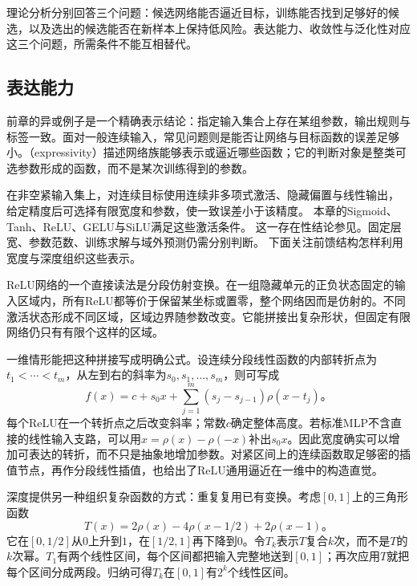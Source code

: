 理论分析分别回答三个问题：候选网络能否逼近目标，训练能否找到足够好的候选，以及选出的候选能否在新样本上保持低风险。表达能力、收敛性与泛化性对应这三个问题，所需条件不能互相替代。

\subsection{表达能力}
\label{sec:ffn-expressivity}

前章的异或例子是一个精确表示结论：指定输入集合上存在某组参数，输出规则与标签一致。面对一般连续输入，常见问题则是能否让网络与目标函数的误差足够小。（expressivity）描述网络族能够表示或逼近哪些函数；它的判断对象是整类可选参数形成的函数，而不是某次训练得到的参数。

在非空紧输入集上，对连续目标使用连续非多项式激活、隐藏偏置与线性输出，
给定精度后可选择有限宽度和参数，使一致误差小于该精度。
本章的Sigmoid、Tanh、ReLU、GELU与SiLU满足这些激活条件。
这一存在性结论参见。固定层宽、参数范数、训练求解与域外预测仍需分别判断。
下面关注前馈结构怎样利用宽度与深度组织这些表示。

ReLU网络的一个直接读法是分段仿射变换。在一组隐藏单元的正负状态固定的输入区域内，所有ReLU都等价于保留某坐标或置零，整个网络因而是仿射的。不同激活状态形成不同区域，区域边界随参数改变。它能拼接出复杂形状，但固定有限网络仍只有有限个这样的区域。

一维情形能把这种拼接写成明确公式。设连续分段线性函数的内部转折点为$t_1<\cdots<t_m$，从左到右的斜率为$s_0,s_1,\ldots,s_m$，则可写成
\begin{equation}
  f(x)=c+s_0x+
  \sum_{j=1}^{m}(s_j-s_{j-1})\rho(x-t_j)\text{。}
  \label{eq:ffn-piecewise-linear-representation}
\end{equation}
每个ReLU在一个转折点之后改变斜率；常数$c$确定整体高度。若标准MLP不含直接的线性输入支路，可以用$x=\rho(x)-\rho(-x)$补出$s_0x$。因此宽度确实可以增加可表达的转折，而不只是抽象地增加参数。对紧区间上的连续函数取足够密的插值节点，再作分段线性插值，也给出了ReLU通用逼近在一维中的构造直觉。

深度提供另一种组织复杂函数的方式：重复复用已有变换。考虑$[0,1]$上的三角形函数
\begin{equation}
  T(x)=2\rho(x)-4\rho(x-1/2)+2\rho(x-1)\text{。}
  \label{eq:ffn-tent-function}
\end{equation}
它在$[0,1/2]$从$0$上升到$1$，在$[1/2,1]$再下降到$0$。令$T_k$表示$T$复合$k$次，而不是$T$的$k$次幂。$T_1$有两个线性区间，每个区间都把输入完整地送到$[0,1]$；再次应用$T$就把每个区间分成两段。归纳可得$T_k$在$[0,1]$有$2^k$个线性区间。

